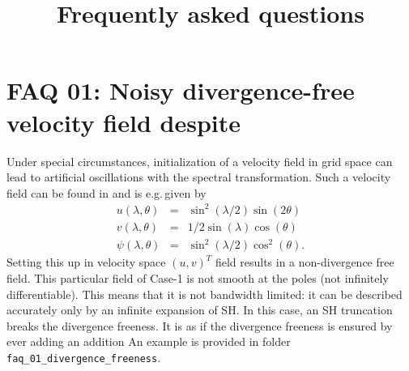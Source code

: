\documentclass[10pt,a4paper]{article}
\begin{document}
	\title{Frequently asked questions}
	
	\section{FAQ 01: Noisy divergence-free velocity field despite}
	Under special circumstances, initialization of a velocity field in grid space can lead to artificial oscillations with the spectral transformation.
	Such a velocity field can be found in \cite{nair2010} and is e.g.\,given by
	\begin{eqnarray}
		u(\lambda,\theta) &=& \sin^2(\lambda/2) \sin(2\theta)\\
		v(\lambda,\theta) &=& 1/2 \sin(\lambda) \cos(\theta)\\
		\psi(\lambda,\theta) &=& \sin^2(\lambda/2) \cos^2(\theta).
	\end{eqnarray}
	Setting this up in velocity space $(u,v)^T$ field results in a non-divergence free field.
This particular field of Case-1 is not smooth at the poles (not infinitely differentiable).
This means that it is  not bandwidth limited: it can be described accurately only by an infinite expansion of SH.
In this case, an SH truncation breaks the divergence freeness.
It is as if the divergence freeness is ensured by ever adding an addition
An example is provided in folder \texttt{faq\_01\_divergence\_freeness}.
	

\begin{thebibliography}{9}
\end{thebibliography}
\end{document}
